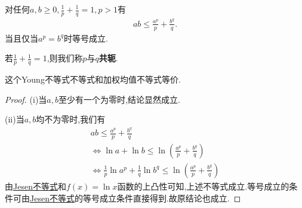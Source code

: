 \documentclass[../../main.tex]{subfiles}
\begin{document}
\begin{theorem}[Young不等式]\label{theorem:Young不等式}
对任何$a,b\geqslant 0,\frac{1}{p}+\frac{1}{q}=1,p>1$有
\begin{align*}
ab\leqslant \frac{a^p}{p}+\frac{b^q}{q}.
\end{align*}
当且仅当$a^p=b^q$时等号成立.
\end{theorem}
\begin{note}
若$\frac{1}{p}+\frac{1}{q}=1$,则我们称$p$与$q$\textbf{共轭}.\label{实数之间的共轭}
\end{note}
\begin{remark}
这个Young不等式不等式和加权均值不等式等价.
\end{remark}
\begin{proof}
(i)当$a,b$至少有一个为零时,结论显然成立.

(ii)当$a,b$均不为零时,我们有
\begin{gather*}
ab\leqslant \frac{a^p}{p}+\frac{b^q}{q}
\\
\Leftrightarrow \ln a+\ln b\leqslant \ln \left( \frac{a^p}{p}+\frac{b^q}{q} \right) 
\\
\Leftrightarrow \frac{1}{p}\ln a^p+\frac{1}{q}\ln b^q\leqslant \ln \left( \frac{a^p}{p}+\frac{b^q}{q} \right) 
\end{gather*}
由\hyperref[theorem:Jesen不等式]{Jesen不等式}和$f\left( x \right) =\ln x$函数的上凸性可知,上述不等式成立.等号成立的条件可由\hyperref[theorem:Jesen不等式]{Jesen不等式}的等号成立条件直接得到.故原结论也成立.   

\end{proof}
\end{document}
